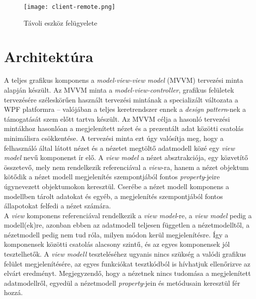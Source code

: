 \begin{figure}[h]
\vspace{.5cm}
\texttt{[image: client-remote.png]}
\centering
\vspace{.2cm}
\caption{Távoli eszköz felügyelete}
\vspace{.5cm}
\label{fig:client-remote}
\end{figure}



\section{Architektúra}

A teljes grafikus komponens a \emph{model-view-view model} (MVVM) tervezési minta alapján készült. Az MVVM minta a \emph{model-view-controller}, grafikus felületek tervezésére széleskörűen használt tervezési mintának a specializált változata a WPF platformra -- valójában a teljes keretrendszer ennek a \emph{design pattern}-nek a támogatását szem előtt tartva készült. Az MVVM célja a hasonló tervezési mintákhoz hasonlóan a megjelenített nézet és a prezentált adat közötti csatolás minimálisra csökkentése. A tervezési minta ezt úgy valósítja meg, hogy a felhasználó által látott nézet és a nézetet megtöltő adatmodell közé egy \emph{view model} nevű  komponenst ír elő. A \emph{view model} a nézet absztrakciója, egy közvetítő összetevő, mely nem rendelkezik referenciával a \emph{view}-ra, hanem a nézet objektum kötődik a nézet modell megjelenítés szempontjából fontos \emph{property}-jeire úgynevezett  objektumokon keresztül. Cserébe a nézet modell komponens a modellben tárolt adatokat és egyéb, a megjelenítés szempontjából fontos állapotokat felfedi a nézet számára.\\
A \emph{view} komponens referenciával rendelkezik a \emph{view model}-re, a \emph{view model} pedig a modell(ek)re, azonban ebben az adatmodell teljesen független a nézetmodelltől, a nézetmodell pedig nem tud róla, milyen módon kerül megjelenítésre. Így a komponensek közötti csatolás alacsony szintű, és az egyes komponensek jól tesztelhetők. A \emph{view modell} teszteléséhez ugyanis nincs szükség a valódi grafikus felület megjelenítésére, az egyes funkciókat tesztkódból is hívhatjuk ellenőrizve az elvárt eredményt. Megjegyzendő, hogy a nézetnek nincs tudomása a megjelenített adatmodellről, egyedül a nézetmodell \emph{property}-jein és metódusain keresztül fér hozzá. \cite{wpf-mvvm-pattern}\\



